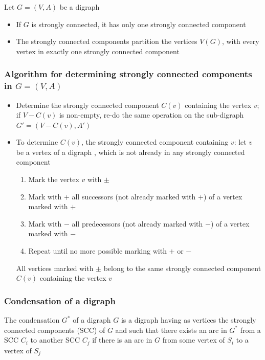 \documentclass[aspectratio=43]{beamer}
\begin{document}
\begin{frame}
	\begin{theorem}[Properties]
		Let $G=(V,A)$ be a digraph
	\begin{itemize}
	\item If $G$ is strongly connected, it has only one strongly connected component
	\item The strongly connected components partition the vertices $V(G)$, with every vertex in exactly one strongly connected component
	\end{itemize}
	\end{theorem}
\end{frame}



\begin{frame}\frametitle{Algorithm for determining strongly connected components in $G=(V,A)$}
	\begin{itemize}
	\item Determine the strongly connected component $C(v)$ containing the vertex $v$; if $V-C(v)$ is non-empty, re-do the same operation on the sub-digraph $G'=(V-C(v),A')$
	\item To determine $C(v)$, the strongly connected component containing $v$: let $v$ be a vertex of a digraph , which is not already in any strongly connected component
	\begin{enumerate}
	\item Mark the vertex $v$ with $\pm$
	\item Mark with $+$ all successors (not already marked with $+$) of a vertex marked with $+$
	\item Mark with $-$ all predecessors (not already marked with $-$) of a vertex marked with $-$
	\item Repeat until no more possible marking with $+$ or $-$
	\end{enumerate}
	All vertices marked with $\pm$ belong to the same strongly connected component $C(v)$ containing the vertex $v$
	\end{itemize}
\end{frame}

\begin{frame}\frametitle{Condensation of a digraph}
	\begin{definition}
		The condensation $G^*$ of a digraph $G$ is a digraph having as vertices the strongly connected components (SCC) of $G$ and such that there exists an arc in $G^*$ from a SCC $C_i$ to another SCC $C_j$ if there is an arc in $G$ from some vertex of $S_i$ to a vertex of $S_j$
	\end{definition}
\end{frame}
\end{document}
